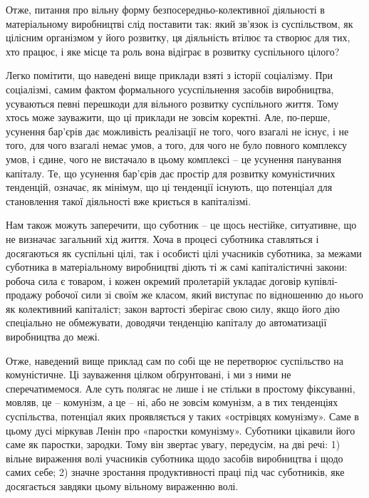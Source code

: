 \documentclass[../main]{subfiles}
\begin{document}
Отже, питання про вільну форму безпосередньо-колективної діяльності в матеріальному виробництві слід поставити так: який зв’язок із суспільством, як цілісним організмом у його розвитку, ця діяльність втілює та створює для тих, хто працює, і яке місце та роль вона відіграє в розвитку суспільного цілого?

Легко помітити, що наведені вище приклади взяті з історії соціалізму. При соціалізмі, самим фактом формального усуспільнення засобів виробництва, усуваються певні перешкоди для вільного розвитку суспільного життя. Тому хтось може зауважити, що ці приклади не зовсім коректні. Але, по-перше, усунення бар’єрів дає можливість реалізації не того, чого взагалі не існує, і не того, для чого взагалі немає умов, а того, для чого не було повного комплексу умов, і єдине, чого не вистачало в цьому комплексі – це усунення панування капіталу. Те, що усунення бар’єрів дає простір для розвитку комуністичних тенденцій, означає, як мінімум, що ці тенденції існують, що потенціал для становлення такої діяльності вже криється в капіталізмі.

Нам також можуть заперечити, що суботник – це щось нестійке, ситуативне, що не визначає загальний хід життя. Хоча в процесі суботника ставляться і досягаються як суспільні цілі, так і особисті цілі учасників суботника, за межами суботника в матеріальному виробництві діють ті ж самі капіталістичні закони: робоча сила є товаром, і кожен окремий пролетарій укладає договір купівлі-продажу робочої сили зі своїм же класом, який виступає по відношенню до нього як колективний капіталіст; закон вартості зберігає свою силу, якщо його дію спеціально не обмежувати, доводячи тенденцію капіталу до автоматизації виробництва до межі.

Отже, наведений вище приклад сам по собі ще не перетворює суспільство на комуністичне. Ці зауваження цілком обґрунтовані, і ми з ними не сперечатимемося. Але суть полягає не лише і не стільки в простому фіксуванні, мовляв, це – комунізм, а це – ні, або не зовсім комунізм, а в тих тенденціях суспільства, потенціал яких проявляється у таких «острівцях комунізму». Саме в цьому дусі міркував Ленін про «паростки комунізму». Суботники цікавили його саме як паростки, зародки. Тому він звертає увагу, передусім, на дві речі: 1) вільне вираження волі учасників суботника щодо засобів виробництва і щодо самих себе; 2) значне зростання продуктивності праці під час суботників, яке досягається завдяки цьому вільному вираженню волі.
\end{document}
